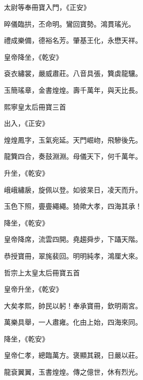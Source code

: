 \begin{pinyinscope}
 太尉等奉冊寶入門，《正安》



 晬儀臨拱，丕命明。鸞回寶勢。鴻貫瑤光。



 禮成樂備，德裕名芳。肇基王化，永懋天祥。



 皇帝降坐，《乾安》



 袞衣繡裳，嚴威肅莊。八音具張，簨虡龍驤。



 玉簡瑤章，金書煌煌。壽千萬年，與天比長。



 熙寧皇太后冊寶三首



 出入，《正安》



 煌煌鳳字，玉氣宛延。天門崛岉，飛驂後先。



 龍簨四合，奏鼓淵淵。母儀天下，何千萬年。



 升坐，《乾安》



 峨峨繡扆，旋佩以登。如彼杲日，凌天而升。



 玉色下照，亹亹繩繩。猗歟大孝，四海其承！



 降坐，《乾安》



 皇帝降席，流雲四開。堯趨舜步，下躡天階。



 恭授寶冊，翠旄裴回。明明純孝，鴻厘大來。



 哲宗上太皇太后冊寶五首



 皇帝升坐，《乾安》



 大矣孝熙，帥民以躬！奉承寶冊，欽明兩宮。



 萬樂具舉，一人肅雍。化由上始，四海來同。



 降坐，《乾安》



 皇帝仁孝，總臨萬方。褒顯其親，日嚴以莊。



 龍袞翼翼，玉書煌煌。傳之億世，休有烈光。




\end{pinyinscope}
